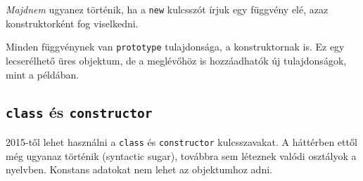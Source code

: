 \begin{frame}
    \begin{exampleblock}{}
        \small
        
    \end{exampleblock}
\end{frame}

\begin{frame}
    \emph{Majdnem} ugyanez történik, ha a \texttt{new} kulcsszót írjuk egy függvény elé, azaz konstruktorként fog viselkedni.
    \begin{exampleblock}{}
        \footnotesize
        
    \end{exampleblock}
\end{frame}

\begin{frame}
    \begin{exampleblock}{}
        \footnotesize
        
    \end{exampleblock}
    Minden függvénynek van \texttt{prototype} tulajdonsága, a konstruktornak is. Ez egy lecserélhető üres objektum, 
    de a meglévőhöz is hozzáadhatók új tulajdonságok, mint a példában. 
\end{frame}

\subsection{\texttt{class} és \texttt{constructor}}

\begin{frame}
    2015-től lehet használni a \texttt{class} és \texttt{constructor} kulcsszavakat. A háttérben ettől még 
    ugyanaz történik (syntactic sugar), továbbra sem léteznek valódi osztályok a nyelvben. Konstans adatokat nem lehet 
    az objektumhoz adni.
    \begin{exampleblock}{}
        \footnotesize
        \vspace{-.2cm}
        
        \vspace{-.2cm}
    \end{exampleblock}
\end{frame}

